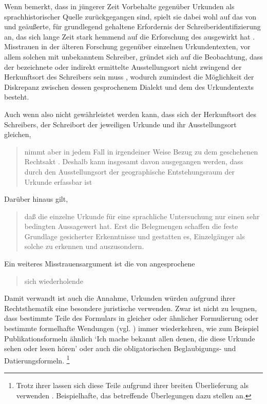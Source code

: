 Wenn \citeauthor{schulze2011} bemerkt, dass in jüngerer Zeit Vorbehalte
gegenüber Urkunden als sprachhistorischer Quelle zurückgegangen sind, spielt
sie dabei wohl auf das von \citet[23--33]{boesch1946} und
\citet[389]{haacke1955} geäußerte, für grundlegend gehaltene Erfordernis der
Schrei\-ber\-identifizierung an, das sich lange Zeit stark hemmend auf die
Erforschung des \CAO{} ausgewirkt hat \autocite[21--22]{schulze2011}.
Misstrauen in der älteren Forschung gegenüber einzelnen Urkunden\-texten, vor
allem solchen mit unbekanntem Schreiber, gründet sich auf die Beobachtung, dass
der bezeichnete oder indirekt ermittelte Ausstellungsort nicht zwingend der
Herkunftsort des Schreibers sein muss \autocite[16]{schulze2011}, wodurch
zumindest die Möglichkeit der Diskrepanz zwischen dessen gesprochenem Dialekt
und dem  des Urkundentexts besteht.

Auch wenn also nicht gewährleistet werden kann, dass sich der Herkunftsort des
Schreibers, der Schreibort der jeweiligen Urkunde und ihr Ausstellungsort
gleichen, \blockcquote[331--332]{ganslmayeretal2003}{nimmt  aber in jedem Fall in irgendeiner Weise Bezug zu dem
geschehenen Rechtsakt \textelp{}. Deshalb kann insgesamt davon ausgegangen
werden, dass durch den Ausstellungsort der geographische
Entstehungsraum der Urkunde erfassbar ist}. Darüber hinaus gilt,
\blockcquote[122]{deboor1974}{daß die einzelne Urkunde für eine sprachliche
Untersuchung nur einen sehr bedingten Aussagewert hat. Erst die Belegmengen
schaffen die feste Grundlage gesicherter Erkenntnisse und gestatten es,
Einzelgänger als solche zu erkennen und auszusondern.}

Ein weiteres Misstrauensargument ist die von \citet[1311]{wegera2000}
angesprochene \blockquote{sich wiederholende }. Damit
verwandt ist auch die Annahme, Urkunden würden aufgrund ihrer Rechtsthematik
eine besondere juristische  verwenden. Zwar ist nicht zu
leugnen, dass bestimmte Teile des Formulars in gleicher oder ähnlicher
Formulierung oder bestimmte formelhafte Wendungen (vgl.
) immer wiederkehren, wie zum Beispiel
Publikationsformeln ähnlich  `Ich mache bekannt allen denen, die diese Urkunde sehen
oder lesen hören' oder auch die obligatorischen Beglaubigungs- und
Datierungsformeln.%
%
	\footnote{%
	Trotz ihrer  lassen sich diese Teile aufgrund ihrer
	breiten Überlieferung als  verwenden
	\autocite[siehe][]{cysouwwaelchli2007}. Beispielhafte, das \CAO{}
	betreffende Überlegungen dazu stellen
	\citet[174--175]{beckerschallert2022b} an.}

